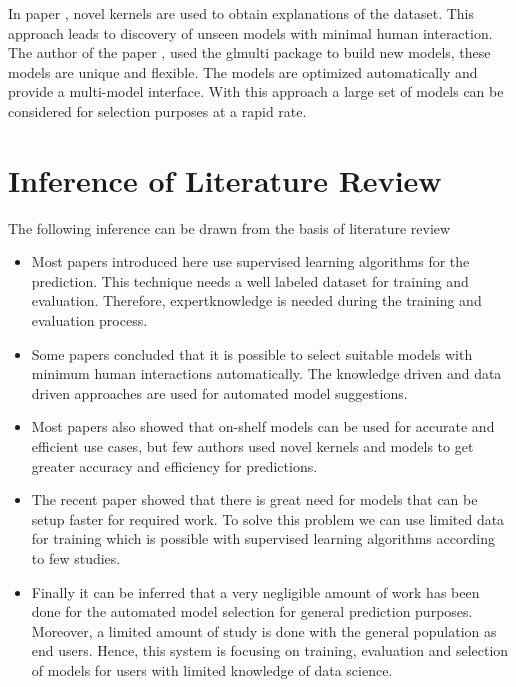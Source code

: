 In paper \cite{malkomes2016bayesian}, novel kernels are used to obtain explanations of the dataset. This approach leads to discovery of unseen models with minimal human interaction. The author of the paper \cite{JSSv034i12}, used the glmulti package to build new models, these models are unique and flexible. The models are optimized automatically and provide a multi-model interface. With this approach a large set of models can be considered for selection purposes at a rapid rate.

\section{Inference of Literature Review} \label{sec:inference _of_literature_review}

The following inference can be drawn from the basis of literature review

\vspace{-1.5em}

\begin{itemize}
  \item Most papers introduced here use supervised learning algorithms for the prediction. This technique needs a well labeled dataset for training and evaluation. Therefore, expertknowledge is needed during the training and evaluation process.
  \item Some papers concluded that it is possible to select suitable models with minimum human interactions automatically. The knowledge driven and data driven approaches are used for automated model suggestions.
  \item Most papers also showed that on-shelf models can be used for accurate and efficient use cases, but few authors used novel kernels and models to get greater accuracy and efficiency for predictions.
  \item The recent paper showed that there is great need for models that can be setup faster for required work. To solve this problem we can use limited data for training which is possible with supervised learning algorithms according to few studies.
  \item Finally it can be inferred that a very negligible amount of work has been done for the automated model selection for general prediction purposes. Moreover, a limited amount of study is done with the general population as end users. Hence, this system is focusing on training, evaluation and selection of models for users with limited knowledge of data science.
\end{itemize}
